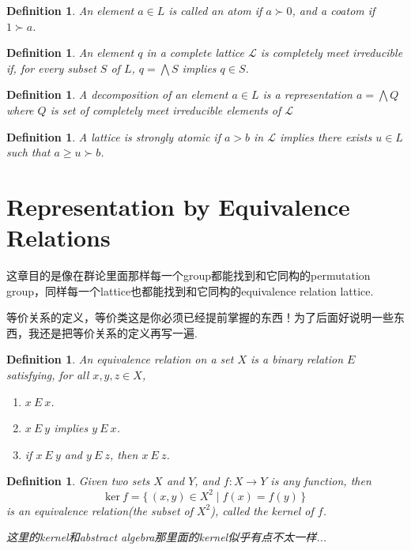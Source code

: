 \documentclass{article}
\newtheorem{definition}[theorem]{Definition}
\newcommand*{\xfunc}[4]{{#2}\colon{#3}{#1}{#4}}
\newcommand*{\func}[3]{\xfunc{\to}{#1}{#2}{#3}}
\newcommand\Set[2]{\{\,#1\mid#2\,\}} %
\newcommand\lattice{\mathcal{L}}
\begin{document}
\begin{definition}
\rm An element $a \in L$ is  called an {\color{red} atom} if $a \succ 0$, and a {\color{red} coatom} if $1 \succ a$. 
\end{definition}

\begin{definition}
\rm An element $q$ in a complete lattice $\lattice$ is {\color{red} completely meet irreducible} if, for every subset $S$ of $L$, $q  = \bigwedge S$ implies $q \in S$.
\end{definition}

\begin{definition}
\rm A {\color{red} decomposition} of an element $a \in L$ is a representation $a = \bigwedge Q$ where $Q$ is set of completely meet irreducible elements of $\lattice$
\end{definition}

\begin{definition}
\rm A lattice is {\color{red} strongly atomic} if $a>b$ in $\lattice$ implies there exists $u \in L$ such that $a \geq u \succ b$.
\end{definition}

\newpage
\section{Representation by Equivalence Relations}

{\color{red} 这章目的是像在群论里面那样每一个group都能找到和它同构的permutation group，同样每一个lattice也都能找到和它同构的equivalence relation lattice}.

{\color{blue} 等价关系的定义，等价类这是你必须已经提前掌握的东西！为了后面好说明一些东西，我还是把等价关系的定义再写一遍}.

\begin{definition}
\rm An {\color{red} equivalence relation} on a set $X$ is a binary relation $E$ satisfying, for all $x, y, z \in X$,
\begin{enumerate}
	\item $x~E~x$.
	\item $x~E~y$ implies $y~E~x$.
	\item if $x~E~y$ and $y~E~z$, then $x~E~z$.
\end{enumerate}
\end{definition}

\begin{definition}
\rm Given two sets $X$ and $Y$, and $\func{f}{X}{Y}$ is any function, then 
$$
\text{ker}~f = \Set{(x,y) \in X^2}{f(x) = f(y)}
$$
is an equivalence relation(the subset of $X^2$), called the kernel of $f$. 

{\color{blue} 这里的kernel和abstract algebra那里面的kernel似乎有点不太一样...}
\end{definition}
\end{document}
